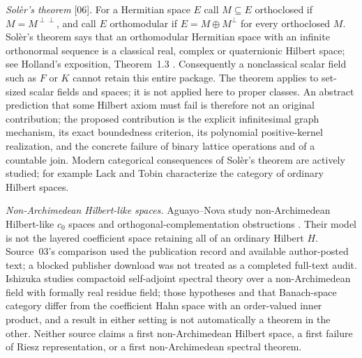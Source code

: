 \documentclass[11pt,letterpaper]{article}
\numberwithin{equation}{section}
\theoremstyle{definition}
\theoremstyle{remark}
\newcommand{\F}{F}
\newcommand{\K}{K}
\newcommand{\src}[1]{\textup{\textsf{\small[#1]}}}
\begin{document}
\emph{Sol\`er's theorem} \src{06}. For a Hermitian space $E$ call
$M\subseteq E$ orthoclosed if $M=M^{\perp\perp}$, and call $E$ orthomodular
if $E=M\oplus M^\perp$ for every orthoclosed $M$. Sol\`er's theorem says
that an orthomodular Hermitian space with an infinite orthonormal sequence is
a classical real, complex or quaternionic Hilbert space; see Holland's
exposition, Theorem~1.3 \cite{Holland,Soler}. Consequently a nonclassical
scalar field such as $\F$ or $\K$ cannot retain this entire package. The
theorem applies to set-sized scalar fields and spaces; it is not applied here
to proper classes. An abstract prediction that some Hilbert axiom must fail is
therefore not an original contribution; the proposed contribution is the
explicit infinitesimal graph mechanism, its exact boundedness criterion, its
polynomial positive-kernel realization, and the concrete failure of binary
lattice operations and of a countable join. Modern categorical consequences
of Sol\`er's theorem are actively studied; for example Lack and Tobin
\cite{LackTobin} characterize the category of ordinary Hilbert spaces.

\emph{Non-Archimedean Hilbert-like spaces.} Aguayo--Nova study
non-Archimedean Hilbert-like $c_0$ spaces and orthogonal-complementation
obstructions \cite{AN}. Their model is not the layered coefficient space
retaining all of an ordinary Hilbert $H$. Source~03's comparison used the
publication record and available author-posted text; a blocked publisher
download was not treated as a completed full-text audit. Ishizuka
\cite{Ishizuka} studies compactoid self-adjoint spectral theory over a
non-Archimedean field with formally real residue field; those hypotheses and
that Banach-space category differ from the coefficient Hahn space with an
order-valued inner product, and a result in either setting is not
automatically a theorem in the other. Neither source claims a first
non-Archimedean Hilbert space, a first failure of Riesz representation, or a
first non-Archimedean spectral theorem.
\end{document}
